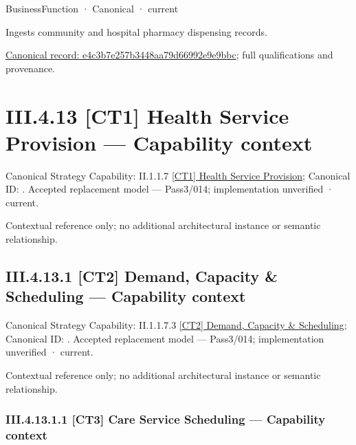 \label{element:e4c3b7e257b3448aa79d66992e9e9bbc}
{\small BusinessFunction · Canonical · current}\par

Ingests community and hospital pharmacy dispensing records.


{\footnotesize \href{../../../../../../../../continuum/business/business-function/e4c3b7e257b3448aa79d66992e9e9bbc.md}{Canonical record: e4c3b7e257b3448aa79d66992e9e9bbc}; full qualifications and provenance.}\par
\section*{III.4.13 [CT1] Health Service Provision — Capability context}
\label{navigation:III.4.13}

{\small Canonical Strategy Capability: II.1.1.7 \hyperref[element:c832a767d295445d8925dd0af885950e]{[CT1] Health Service Provision}; Canonical ID: \texttt{}. Accepted replacement model — Pass3/014; implementation unverified · current.}\par
Contextual reference only; no additional architectural instance or semantic relationship.\par
\subsection*{III.4.13.1 [CT2] Demand, Capacity \& Scheduling — Capability context}
\label{navigation:III.4.13.1}

{\small Canonical Strategy Capability: II.1.1.7.3 \hyperref[element:f94ce7fcb1904141aeae8f2602518126]{[CT2] Demand, Capacity \& Scheduling}; Canonical ID: \texttt{}. Accepted replacement model — Pass3/014; implementation unverified · current.}\par
Contextual reference only; no additional architectural instance or semantic relationship.\par
\subsubsection*{III.4.13.1.1 [CT3] Care Service Scheduling — Capability context}
\label{navigation:III.4.13.1.1}

